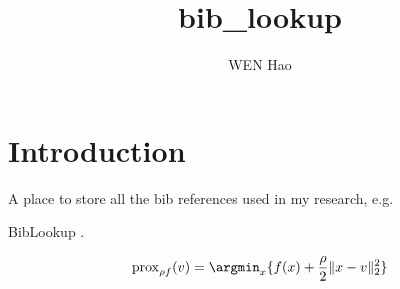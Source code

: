 \documentclass{article}
\title{bib\_lookup}
\author{WEN Hao}
\date{}
\begin{document}
\maketitle

\section{Introduction}

A place to store all the bib references used in my research, e.g. \cite{Wen_cpsc2021,torch_ecg_paper,Kang_2022_cinc2021_iop,wen_cinc2021,Pang_2021_SpineParseNet,kiyasseh2021clocs}

BibLookup \cite{bib_lookup}.

$$\operatorname{prox}_{\rho f}(v) = \argmin_x \{f(x) + \dfrac{\rho}{2} \lVert x-v \rVert_2^2\}$$









\printbibliography[heading=bibliography]
\end{document}
